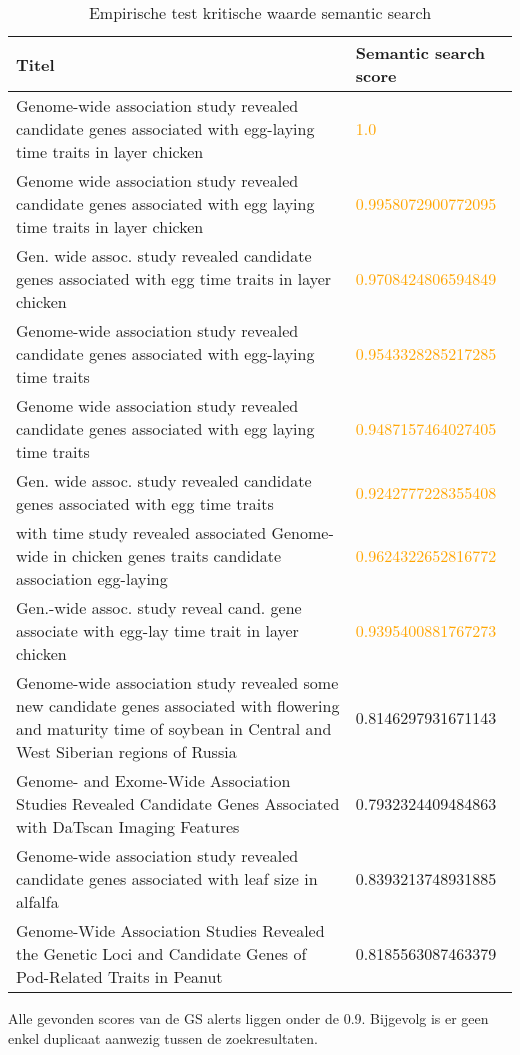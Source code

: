 \begin{table}[h!]
    \caption{Empirische test kritische waarde semantic search}
    \centering
    \begin{tabularx}{\textwidth}{|X|p{4cm}|} 
        \hline
        \textbf{Titel}&\textbf{Semantic search score}\\
        \hline
        Genome-wide association study revealed candidate genes associated with egg-laying time traits in layer chicken&\textcolor{orange}{1.0}\\
        \hline
        Genome wide association study revealed candidate genes associated with egg laying time traits in layer chicken&\textcolor{orange}{0.9958072900772095}\\
        \hline
        Gen. wide assoc. study revealed candidate genes associated with egg time traits in layer chicken&\textcolor{orange}{0.9708424806594849}\\
        \hline
        Genome-wide association study revealed candidate genes associated with egg-laying time traits&\textcolor{orange}{0.9543328285217285}\\
        \hline
        Genome wide association study revealed candidate genes associated with egg laying time traits&\textcolor{orange}{0.9487157464027405}\\
        \hline
        Gen. wide assoc. study revealed candidate genes associated with egg time traits&\textcolor{orange}{0.9242777228355408}\\
        \hline
        with time study revealed associated Genome-wide in chicken genes traits candidate association egg-laying&\textcolor{orange}{0.9624322652816772}\\
        \hline
        Gen.-wide assoc. study reveal cand. gene associate with egg-lay time trait in layer chicken&\textcolor{orange}{0.9395400881767273}\\
        \hline
        Genome-wide association study revealed some new candidate genes associated with flowering and maturity time of soybean in Central and West Siberian regions of Russia&0.8146297931671143\\
        \hline
        Genome- and Exome-Wide Association Studies Revealed Candidate Genes Associated with DaTscan Imaging Features&0.7932324409484863\\
        \hline
        Genome-wide association study revealed candidate genes associated with leaf size in alfalfa&0.8393213748931885\\
        \hline
        Genome-Wide Association Studies Revealed the Genetic Loci and Candidate Genes of Pod-Related Traits in Peanut&0.8185563087463379\\
        \hline
    \end{tabularx}
    \label{table:empirisch}
\end{table}
Alle gevonden scores van de GS alerts liggen onder de 0.9. Bijgevolg is er geen enkel duplicaat aanwezig tussen de zoekresultaten.

